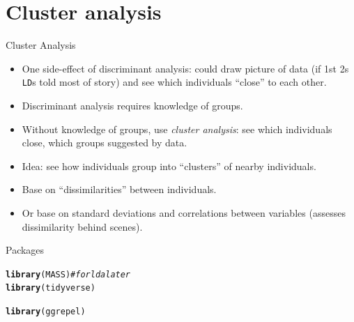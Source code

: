\documentclass[unknownkeysallowed]{beamer}\usepackage[]{graphicx}\usepackage[]{color}
\makeatletter
\newcommand{\hlcom}[1]{\textcolor[rgb]{0.678,0.584,0.686}{\textit{#1}}}%
\newcommand{\hlstd}[1]{\textcolor[rgb]{0.345,0.345,0.345}{#1}}%
\newcommand{\hlkwd}[1]{\textcolor[rgb]{0.737,0.353,0.396}{\textbf{#1}}}%
\newenvironment{kframe}{%
 \def\at@end@of@kframe{}%
 \ifinner\ifhmode%
  \def\at@end@of@kframe{\end{minipage}}%
  \begin{minipage}{\columnwidth}%
 \fi\fi%
 \def\FrameCommand##1{\hskip\@totalleftmargin \hskip-\fboxsep
 \colorbox{shadecolor}{##1}\hskip-\fboxsep
     \hskip-\linewidth \hskip-\@totalleftmargin \hskip\columnwidth}%
 \MakeFramed {\advance\hsize-\width
   \@totalleftmargin\z@ \linewidth\hsize
   \@setminipage}}%
 {\par\unskip\endMakeFramed%
 \at@end@of@kframe}
\newenvironment{knitrout}{}{} %
\makeatother
\begin{document}
\section{Cluster analysis}
\frame{\sectionpage}


\begin{frame}[fragile]{Cluster Analysis}

  \begin{itemize}
  \item One side-effect of discriminant analysis: could draw picture of data (if 1st 2s \texttt{LD}s told most of story) and see which individuals ``close'' to each other.
  \item Discriminant analysis requires knowledge of groups.
  \item Without knowledge of groups, use {\em cluster analysis}: see which individuals close, which groups suggested by data.
  \item Idea: see how individuals group into ``clusters'' of nearby individuals.
  \item Base on ``dissimilarities'' between individuals.
  \item Or base on standard deviations and correlations between variables (assesses dissimilarity behind scenes).
  \end{itemize}

\end{frame}

\begin{frame}[fragile]{Packages}
  
\begin{knitrout}
\color{fgcolor}\begin{kframe}
\begin{alltt}
\hlkwd{library}\hlstd{(MASS)} \hlcom{# for lda later}
\hlkwd{library}\hlstd{(tidyverse)}
\end{alltt}


{\ttfamily\noindent\itshape\color{messagecolor}{\#\# -- Attaching packages ------------------- tidyverse 1.2.1 --}}

{\ttfamily\noindent\itshape\color{messagecolor}{\#\# v ggplot2 3.1.0\ \ \ \  v purrr\ \  0.2.5\\\#\# v tibble\ \ 1.4.2\ \ \ \  v dplyr\ \  0.7.8\\\#\# v tidyr\ \  0.8.1\ \ \ \  v stringr 1.3.1\\\#\# v readr\ \  1.1.1\ \ \ \  v forcats 0.3.0}}

{\ttfamily\noindent\itshape\color{messagecolor}{\#\# -- Conflicts ---------------------- tidyverse\_conflicts() --\\\#\# x dplyr::filter() masks stats::filter()\\\#\# x dplyr::lag()\ \ \ \ masks stats::lag()\\\#\# x dplyr::select() masks MASS::select()}}\begin{alltt}
\hlkwd{library}\hlstd{(ggrepel)}
\end{alltt}
\end{kframe}
\end{knitrout}

  
\end{frame}
\end{document}
